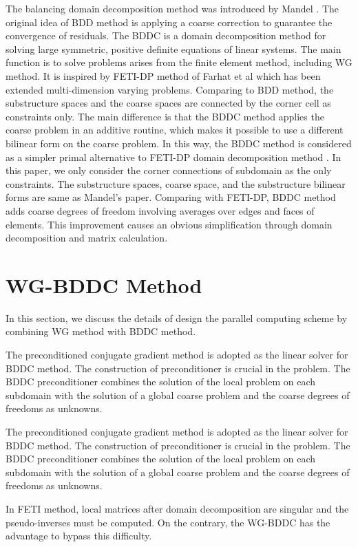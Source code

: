 The balancing domain decomposition method was introduced by Mandel \cite{mandel2005algebraic}. The original idea of BDD method is applying a coarse correction to guarantee the convergence of residuals. The BDDC is a domain decomposition method for solving large symmetric, positive definite equations of linear systems. The main function is to solve problems arises from the finite element method, including WG method. It is inspired by FETI-DP method of Farhat et al \cite{farhat1994optimal, farhat2001feti} which has been extended multi-dimension varying problems. Comparing to BDD method, the substructure spaces and the coarse spaces are connected by the corner cell as constraints only. The main difference is that the BDDC method applies the coarse problem in an additive routine, which makes it possible to use a different bilinear form on the coarse problem. In this way, the BDDC method is considered as a simpler primal alternative to FETI-DP domain decomposition method \cite{li2006feti}. In this paper, we only consider the corner connections of subdomain as the only constraints. The substructure spaces, coarse space, and the substructure bilinear forms are same as Mandel’s paper. Comparing with FETI-DP, BDDC method adds coarse degrees of freedom involving averages over edges and faces of elements. This improvement causes an obvious simplification through domain decomposition and matrix calculation.

\section{WG-BDDC Method}
In this section, we discuss the details of design the parallel computing scheme by combining WG method with BDDC method. 

The preconditioned conjugate gradient method is adopted as the linear solver for BDDC method. The construction of preconditioner is crucial in the problem. The BDDC preconditioner combines the solution of the local problem on each subdomain with the solution of a global coarse problem and the coarse degrees of freedoms as unknowns. 

The preconditioned conjugate gradient method is adopted as the linear solver for BDDC method. The construction of preconditioner is crucial in the problem. The BDDC preconditioner combines the solution of the local problem on each subdomain with the solution of a global coarse problem and the coarse degrees of freedoms as unknowns. 

In FETI method, local matrices after domain decomposition are singular and the pseudo-inverses must be computed. On the contrary, the WG-BDDC has the advantage to bypass this difficulty.

